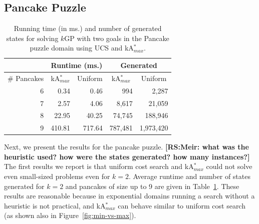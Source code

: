 \documentclass{aicom2e}
\newcommand{\kgs}{$k$GP}
\newcommand{\kastar}{kA$^*$}
\newcommand{\kastarmax}{kA$^*_{max}$}
\newcommand{\kxastar}{k$\times$A$^*$}
\newcommand{\roni}[1]{\textbf{[RS:#1]}}
\begin{document}


\subsection{Pancake Puzzle}

\begin{table}[]
    \centering
    \begin{tabular}{|r|r|r|r|r|}
    \hline
        \multicolumn{1}{|l|}{}            & \multicolumn{2}{c|}{Runtime (ms.)}                                       & \multicolumn{2}{c|}{Generated} \\ \hline
        \multicolumn{1}{|c|}{\# Pancakes} & \multicolumn{1}{c}{\kastarmax{}} & \multicolumn{1}{c|}{Uniform} & \multicolumn{1}{c}{\kastarmax{}} & \multicolumn{1}{c|}{Uniform} \\ \hline
        6                               & 0.34                                      & 0.46                        & 994                                       & 2,287                       \\
        7                               & 2.57                                      & 4.06                        & 8,617                                     & 21,059                      \\
        8                               & 22.95                                     & 40.25                       & 74,745                                    & 188,946                     \\
        9                               & 410.81                                    & 717.64                      & 787,481                                   &
        1,973,420\\
        \hline
    \end{tabular}
    \caption{Running time (in ms.) and number of generated states for solving \kgs{} with two goals
        in the Pancake puzzle domain using UCS and \kastarmax{}.}
\label{tab:pancake-max-uniform}
\end{table}

Next, we present the results for the pancake puzzle.
\roni{Meir: what was the heuristic used? how were the states generated? how many instances?}
The first results we report is that uniform cost search and \kastarmax{}
could not solve even small-sized problems even for $k=2$. Average runtime and number of states generated  for $k=2$ and pancakes of size up to 9 are given in Table~\ref{tab:pancake-max-uniform}. These results are reasonable because in exponential domains running a search without a heuristic is not practical, and \kastarmax{} can behave similar to uniform cost search (as shown also in Figure~\ref{fig:min-vs-max}).
\end{document}
